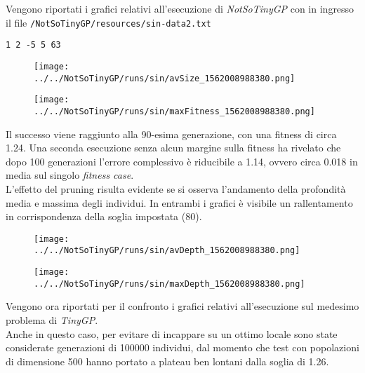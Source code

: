 \documentclass{../llncs}
\newcommand{\labelfig}[1]{\label{fig:#1}}
\begin{document}
\indent Vengono riportati i grafici relativi all'esecuzione di \emph{NotSoTinyGP} con in ingresso il file \texttt{/NotSoTinyGP/resources/sin-data2.txt}
\begin{lstlisting}[caption={Prima riga di \texttt{/NotSoTinyGP/resources/sin-data2.txt}}]
1 2 -5 5 63
\end{lstlisting}

\begin{figure}[!htb]
\centering
\texttt{[image: ../../NotSoTinyGP/runs/sin/avSize\_1562008988380.png]}
\end{figure}

\begin{figure}[!htb]
\centering
\texttt{[image: ../../NotSoTinyGP/runs/sin/maxFitness\_1562008988380.png]}
\end{figure}

Il successo viene raggiunto alla 90-esima generazione, con una fitness di circa 1.24. Una seconda esecuzione senza alcun margine sulla fitness ha rivelato che dopo 100 generazioni l'errore complessivo è riducibile a 1.14, ovvero circa 0.018 in media sul singolo \emph{fitness case}.\\

L'effetto del pruning risulta evidente se si osserva l'andamento della profondità media e massima degli individui. In entrambi i grafici è visibile un rallentamento in corrispondenza della soglia impostata (80).\\

\begin{figure}[!htb]
\centering
\texttt{[image: ../../NotSoTinyGP/runs/sin/avDepth\_1562008988380.png]}
\end{figure}

\begin{figure}[!htb]
\centering
\texttt{[image: ../../NotSoTinyGP/runs/sin/maxDepth\_1562008988380.png]}
\end{figure}

Vengono ora riportati per il confronto i grafici relativi all'esecuzione sul medesimo problema di \emph{TinyGP}.\\

Anche in questo caso, per evitare di incappare su un ottimo locale sono state considerate generazioni di 100000 individui, dal momento che test con popolazioni di dimensione 500 hanno portato a plateau ben lontani dalla soglia di 1.26.
\end{document}
